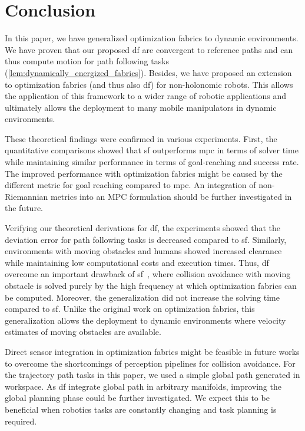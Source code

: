 \section{Conclusion}%
\label{sec:conclusion}

In this paper, we have generalized optimization fabrics to dynamic
environments. We have proven that our proposed \acl{df} are convergent to
reference paths and can thus compute motion for path following tasks
(\cref{lem:dynamically_energized_fabrics}). Besides, we have proposed an
extension to optimization fabrics (and thus also \ac{df}) for
non-holonomic robots. This allows the application of this framework to a wider
range of robotic applications and ultimately allows the deployment to many
mobile manipulators in dynamic environments.

These theoretical findings were confirmed in various experiments. First, the
quantitative comparisons showed that \acl{sf} outperforms \ac{mpc} in terms of
solver time while maintaining similar performance in terms of goal-reaching and
success rate. 
The improved performance with optimization fabrics might be caused
by the different metric for goal
reaching compared to \acl{mpc}. An integration of
non-Riemannian metrics into an MPC formulation should be further
investigated in the future.

Verifying our theoretical derivations for \ac{df}, the experiments
showed that the deviation error for path following tasks is decreased compared
to \ac{sf}. Similarly, environments with moving obstacles and humans showed
increased clearance while maintaining low computational costs and execution
times. Thus, \ac{df} overcome an important drawback of
\ac{sf}~\cite{Ratliff2020,Wyk2022}, where collision avoidance with moving
obstacle is solved purely by the high frequency at which optimization fabrics
can be computed. Moreover, the generalization did not increase the solving time
compared to \ac{sf}. Unlike the original work on optimization fabrics, this
generalization allows the deployment to dynamic environments where velocity
estimates of moving obstacles are available.

Direct sensor integration in optimization fabrics might be feasible in future
works to overcome the shortcomings of perception pipelines for collision
avoidance. For the trajectory path tasks in this paper, we
used a simple global path generated in workspace. As \ac{df} integrate
global path in arbitrary manifolds, improving the global planning phase could
be further investigated. We expect this to be beneficial when robotics tasks
are constantly changing and task planning is required.
